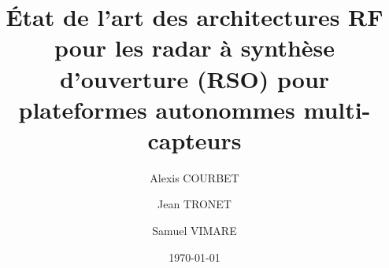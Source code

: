 \documentclass[11pt,a4paper,french]{article}
\begin{document}

		

             

\title{État de l’art des architectures RF pour les radar à synthèse d'ouverture (RSO) pour plateformes autonommes multi-capteurs}

\author{
	Alexis COURBET\and
    Jean TRONET\and
    Samuel VIMARE
}




\date{\today}

\IMTAfrontcover
\pagestyle{IMTAfancy} %

\IMTAsommaire
\newpage
\IMTAlistefigures  %
\IMTAlistetableaux   %
\newpage
%
\end{document}

